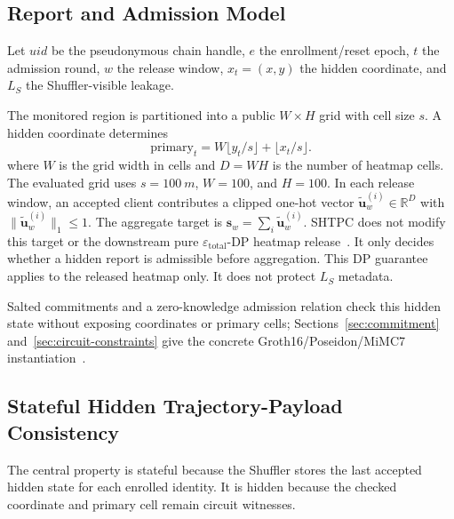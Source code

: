 \documentclass[journal]{IEEEtran}
\theoremstyle{definition}
\theoremstyle{plain}
\begin{document}
\subsection{Report and Admission Model}
\label{sec:prelim-model}

Let \(uid\) be the pseudonymous chain handle, \(e\) the enrollment/reset epoch,
\(t\) the admission round, \(w\) the release window, \(x_t=(x,y)\) the hidden
coordinate, and \(L_S\) the Shuffler-visible leakage.

The monitored region is partitioned into a public \(W\times H\) grid with cell
size \(s\). A hidden coordinate determines
\[
  \mathrm{primary}_t=W\lfloor y_t/s\rfloor+\lfloor x_t/s\rfloor .
\]
\noindent where \(W\) is the grid width in cells and
\(D=WH\) is the number of heatmap cells. The evaluated grid uses
\(s=\SI{100}{m}\), \(W=100\), and \(H=100\). In each release window, an
accepted client contributes a clipped one-hot vector
\(\tilde{\mathbf{u}}_w^{(i)}\in\mathbb{R}^D\) with
\(\|\tilde{\mathbf{u}}_w^{(i)}\|_1\le 1\). The aggregate target is
\(\mathbf{s}_w=\sum_i\tilde{\mathbf{u}}_w^{(i)}\). \textsc{SHTPC} does not
modify this target or the downstream pure
\(\varepsilon_{\mathrm{total}}\)-DP heatmap release~\cite{Dwork2006calibrating}.
It only decides whether a hidden report is admissible before aggregation. This
DP guarantee applies to the released heatmap only. It does not protect \(L_S\)
metadata.

Salted commitments and a zero-knowledge admission relation check this hidden
state without exposing coordinates or primary cells; Sections~\ref{sec:commitment}
and~\ref{sec:circuit-constraints} give the concrete Groth16/Poseidon/MiMC7
instantiation~\cite{Groth2016pairing,Grassi2021Poseidon,Albrecht2016MiMC}.

\subsection{Stateful Hidden Trajectory-Payload Consistency}
\label{sec:prelim-goals}

The central property is stateful because the Shuffler stores the last accepted
hidden state for each enrolled identity. It is hidden because the checked
coordinate and primary cell remain circuit witnesses.
\end{document}
